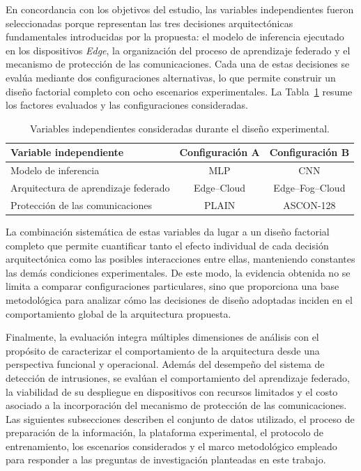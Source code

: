 \documentclass[journal,article,submit,moreauthors]{Definitions/mdpi}
\begin{document}
En concordancia con los objetivos del estudio, las variables independientes fueron seleccionadas porque representan las tres decisiones arquitectónicas fundamentales introducidas por la propuesta: el modelo de inferencia ejecutado en los dispositivos \textit{Edge}, la organización del proceso de aprendizaje federado y el mecanismo de protección de las comunicaciones. Cada una de estas decisiones se evalúa mediante dos configuraciones alternativas, lo que permite construir un diseño factorial completo con ocho escenarios experimentales. La Tabla~\ref{tab:experimental_factors} resume los factores evaluados y las configuraciones consideradas.

\begin{table}[ht]
\centering
\caption{Variables independientes consideradas durante el diseño experimental.}
\label{tab:experimental_factors}
\footnotesize
\begin{tabular}{lcc}
\toprule
\textbf{Variable independiente} & \textbf{Configuración A} & \textbf{Configuración B} \\
\midrule
Modelo de inferencia & MLP & CNN \\
Arquitectura de aprendizaje federado & Edge--Cloud & Edge--Fog--Cloud \\
Protección de las comunicaciones & PLAIN & ASCON-128 \\
\bottomrule
\end{tabular}
\end{table}

La combinación sistemática de estas variables da lugar a un diseño factorial completo que permite cuantificar tanto el efecto individual de cada decisión arquitectónica como las posibles interacciones entre ellas, manteniendo constantes las demás condiciones experimentales. De este modo, la evidencia obtenida no se limita a comparar configuraciones particulares, sino que proporciona una base metodológica para analizar cómo las decisiones de diseño adoptadas inciden en el comportamiento global de la arquitectura propuesta.

Finalmente, la evaluación integra múltiples dimensiones de análisis con el propósito de caracterizar el comportamiento de la arquitectura desde una perspectiva funcional y operacional. Además del desempeño del sistema de detección de intrusiones, se evalúan el comportamiento del aprendizaje federado, la viabilidad de su despliegue en dispositivos con recursos limitados y el costo asociado a la incorporación del mecanismo de protección de las comunicaciones. Las siguientes subsecciones describen el conjunto de datos utilizado, el proceso de preparación de la información, la plataforma experimental, el protocolo de entrenamiento, los escenarios considerados y el marco metodológico empleado para responder a las preguntas de investigación planteadas en este trabajo.
\end{document}
